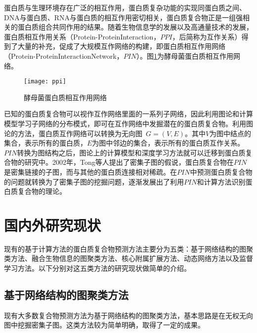 蛋白质与生理环境存在广泛的相互作用，蛋白质复杂功能的实现同蛋白质之间、DNA与蛋白质、RNA与蛋白质的相互作用密切相关，蛋白质复合物正是一组强相关的蛋白质组合共同作用的结果。随着生物信息学的发展以及高通量技术的发展，蛋白质相互作用关系（Protein-ProteinInteraction，$PPI$，后简称为互作关系）得到了大量的补充，促成了大规模互作网络的构建\cite{butland_interaction_2005}，即蛋白质相互作用网络（Protein-ProteinInteractionNetwork，$PIN$）。图\ref{fig:ppi}为酵母菌蛋白质相互作用网络。
\begin{figure}[htbp]
  \centering
  \texttt{[image: ppi]}
  \caption{酵母菌蛋白质相互作用网络}
  \label{fig:ppi}
\end{figure}
已知的蛋白质复合物可以视作互作网络里面的一系列子网络，因此利用图论和计算模型学习子网络的分布模式，即可在互作网络中发掘潜在的蛋白质复合物\cite{legrain_proteinprotein_2001}。利用图论的方法，蛋白质互作网络可以转换为无向图~$G=(V,E)$。其中$V$为图中结点的集合，表示所有的蛋白质，$E$为图中邻边的集合，表示所有的蛋白质互作关系。$PIN$转换为图结构之后，图论上的计算模型和深度学习方法就可以迁移到蛋白质复合物的研究中。2002年，Tong\cite{tong_combined_2002}等人提出了密集子图的假说，蛋白质复合物在$PIN$是密集链接的子图，而与其他的蛋白质连接相对稀疏。在$PIN$中预测蛋白质复合物的问题就转换为了密集子图的挖掘问题，逐渐发展出了利用$PIN$和计算方法识别蛋白质复合物的理论。

\section{国内外研究现状}
\label{section:research}

现有的基于计算方法的蛋白质复合物预测方法主要分为五类：基于网络结构的图聚类方法、融合生物信息的图聚类方法、核心附属扩展方法、动态网络方法以及监督学习方法。以下分别对这五类方法的研究现状做简单的介绍。

\subsection{基于网络结构的图聚类方法}
\label{section:TopologyMethod}

现有大多数复合物预测方法为基于网络结构的图聚类方法，基本思路是在无权无向图中挖掘密集子图。这类方法较为简单明确，取得了一定的成果。

